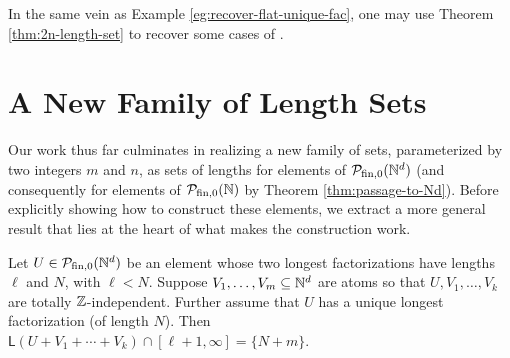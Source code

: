 \begin{rk}
	In the same vein as Example \ref{eg:recover-flat-unique-fac}, one may use Theorem \ref{thm:2n-length-set} to recover some cases of \cite[Proposition 4.8]{fan-tringali18}.
\end{rk}


\section{A New Family of Length Sets} \label{sec:new length sets}
Our work thus far culminates in realizing a new family of sets, parameterized by two integers $m$ and $n$, as sets of lengths for elements of $\mathcal{P}_{\textrm{fin}, 0}(\mathbb{N}^d)$ (and consequently for elements of ${\mathcal{P}_{\textrm{fin},0}(\mathbb{N})}$ by Theorem \ref{thm:passage-to-Nd}).
Before explicitly showing how to construct these elements, we extract a more general result that lies at the heart of what makes the construction work. 


\begin{thm} \label{thm:unique longest factorization}
	Let $U\in \mathcal{P}_{\textrm{fin}, 0}(\mathbb{N}^d)$ be an element whose two longest factorizations have lengths $\ell$ and $N$, with $\ell < N$.
	Suppose $V_1,\dots,V_m\subseteq \mathbb{N}^d$ are atoms so that $U,V_1,\dots, V_k$ are totally $\mathbb{Z}$-independent.
	Further assume that $U$ has a unique longest factorization (of length $N$).
	Then $\mathsf{L}(U+V_1+\cdots+V_k) \cap [ \ell+1,\infty ] = \{N+m\}$.
\end{thm}


